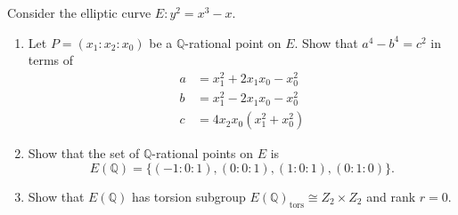 \documentclass[12 pt, letterpaper]{hmcpset}
\begin{document}
\begin{problem}[Problem 1.]
	Consider the elliptic curve $E : y^{2} = x^{3} - x$.
	\begin{enumerate}
		\item Let $P = (x_{1} : x_{2} : x_{0})$ be a $\mathbb{Q}$-rational point on $E$. Show that $a^{4} - b^{4} = c^{2}$ in terms of
			\[
				\begin{split}
					a & = x_{1}^{2} + 2 x_{1} x_{0} - x_{0}^{2} \\
					b & = x_{1}^{2} - 2 x_{1} x_{0} - x_{0}^{2} \\
					c & = 4 x_{2} x_{0} (x_{1}^{2} + x_{0}^{2})
				\end{split}
			\]
		\item Show that the set of $\mathbb{Q}$-rational points on $E$ is
			\[
				E(\mathbb{Q}) = \{ (-1 : 0 : 1), (0 : 0 : 1), (1 : 0 : 1), (0 : 1 : 0) \}.
			\]
		\item Show that  $E(\mathbb{Q})$ has torsion subgroup $E(\mathbb{Q})_{\text{tors}} \cong Z_{2} \times Z_{2}$ and rank $r = 0$.
	\end{enumerate}
\end{problem}
\end{document}
